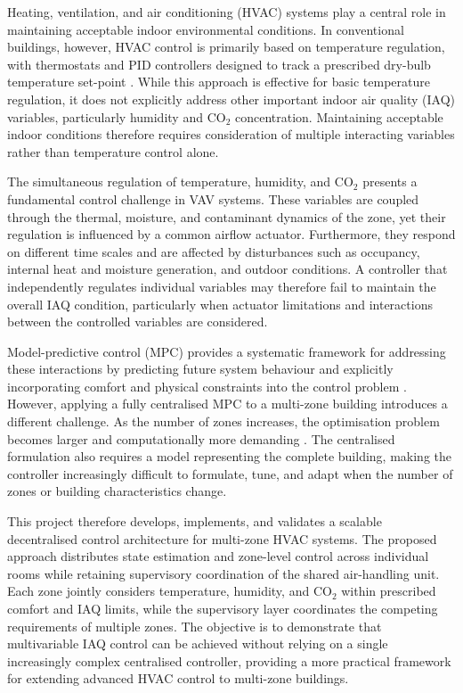 \documentclass[12pt, a4paper]{article}
\begin{document}
	Heating, ventilation, and air conditioning (HVAC) systems play a central role in maintaining acceptable indoor environmental conditions. In conventional buildings, however, HVAC control is primarily based on temperature regulation, with thermostats and PID controllers designed to track a prescribed dry-bulb temperature set-point \citep{harroldAutomaticControlsBuilding1988}. While this approach is effective for basic temperature regulation, it does not explicitly address other important indoor air quality (IAQ) variables, particularly humidity and CO$_2$ concentration. Maintaining acceptable indoor conditions therefore requires consideration of multiple interacting variables rather than temperature control alone.
	
	The simultaneous regulation of temperature, humidity, and CO$_2$ presents a fundamental control challenge in VAV systems. These variables are coupled through the thermal, moisture, and contaminant dynamics of the zone, yet their regulation is influenced by a common airflow actuator. Furthermore, they respond on different time scales and are affected by disturbances such as occupancy, internal heat and moisture generation, and outdoor conditions. A controller that independently regulates individual variables may therefore fail to maintain the overall IAQ condition, particularly when actuator limitations and interactions between the controlled variables are considered.
	
	Model-predictive control (MPC) provides a systematic framework for addressing these interactions by predicting future system behaviour and explicitly incorporating comfort and physical constraints into the control problem \citep{camachoModelPredictiveControl2007, aframTheoryApplicationsHVAC2014}. However, applying a fully centralised MPC to a multi-zone building introduces a different challenge. As the number of zones increases, the optimisation problem becomes larger and computationally more demanding \citep{yangHVACEnergyCost2019}. The centralised formulation also requires a model representing the complete building, making the controller increasingly difficult to formulate, tune, and adapt when the number of zones or building characteristics change.
	
	This project therefore develops, implements, and validates a scalable decentralised control architecture for multi-zone HVAC systems. The proposed approach distributes state estimation and zone-level control across individual rooms while retaining supervisory coordination of the shared air-handling unit. Each zone jointly considers temperature, humidity, and CO$_2$ within prescribed comfort and IAQ limits, while the supervisory layer coordinates the competing requirements of multiple zones. The objective is to demonstrate that multivariable IAQ control can be achieved without relying on a single increasingly complex centralised controller, providing a more practical framework for extending advanced HVAC control to multi-zone buildings.
	
\end{document}
